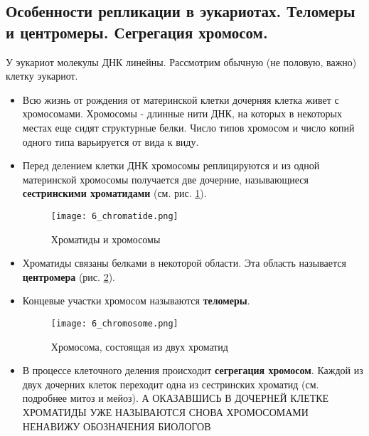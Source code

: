 \subsection{Особенности репликации в эукариотах. Теломеры и центромеры. Сегрегация хромосом.}

У эукариот молекулы ДНК линейны. Рассмотрим обычную (не половую, важно) клетку эукариот. 

\begin{itemize}
    \item Всю жизнь от рождения от материнской клетки дочерняя клетка живет с хромосомами. Хромосомы - длинные нити ДНК, на которых в некоторых местах еще сидят структурные белки. Число типов хромосом и число копий одного типа варьируется от вида к виду.
    
    \item Перед делением клетки ДНК хромосомы реплицируются и из одной материнской хромосомы получается две дочерние, называющиеся \textbf{сестринскими хроматидами} (см. рис. \ref{fig:6_chromatide}).
    
    \begin{figure}[H]
        \centering
        \texttt{[image: 6\_chromatide.png]}
        \caption{Хроматиды и хромосомы}
        \label{fig:6_chromatide}
    \end{figure}
    
    \item Хроматиды связаны белками в некоторой области. Эта область называется \textbf{центромера} (рис. \ref{fig:6_chromosome}).
    
    \item Концевые участки хромосом называются \textbf{теломеры}.
    
    \begin{figure}[H]
        \centering
        \texttt{[image: 6\_chromosome.png]}
        \caption{Хромосома, состоящая из двух хроматид}
        \label{fig:6_chromosome}
    \end{figure}
    
    \item В процессе клеточного деления происходит \textbf{сегрегация хромосом}. Каждой из двух дочерних клеток переходит одна из сестринских хроматид (см. подробнее митоз и мейоз). А ОКАЗАВШИСЬ В ДОЧЕРНЕЙ КЛЕТКЕ ХРОМАТИДЫ УЖЕ НАЗЫВАЮТСЯ СНОВА ХРОМОСОМАМИ НЕНАВИЖУ ОБОЗНАЧЕНИЯ БИОЛОГОВ
\end{itemize}
